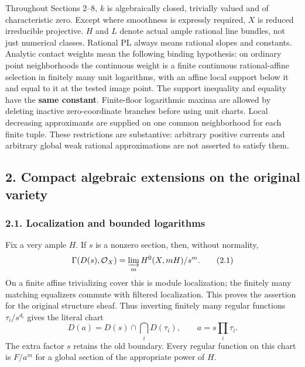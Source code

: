 \documentclass[
  10pt,
]{article}
\begin{document}
Throughout Sections 2--8, \(k\) is algebraically closed, trivially
valued and of characteristic zero. Except where smoothness is expressly
required, \(X\) is reduced irreducible projective. \(H\) and \(L\)
denote actual ample rational line bundles, not just numerical classes.
Rational PL always means rational slopes and constants. Analytic contact
weights mean the following binding hypothesis: on ordinary point
neighborhoods the continuous weight is a finite continuous
rational-affine selection in finitely many unit logarithms, with an
affine local support below it and equal to it at the tested image point.
The support inequality and equality have the \textbf{same constant}.
Finite-floor logarithmic maxima are allowed by deleting inactive
zero-coordinate branches before using unit charts. Local decreasing
approximants are supplied on one common neighborhood for each finite
tuple. These restrictions are substantive: arbitrary positive currents
and arbitrary global weak rational approximations are not asserted to
satisfy them.

\subsection{2. Compact algebraic extensions on the original
variety}\label{compact-algebraic-extensions-on-the-original-variety}

\subsubsection{2.1. Localization and bounded
logarithms}\label{localization-and-bounded-logarithms}

Fix a very ample \(H\). If \(s\) is a nonzero section, then, without
normality,
\[\Gamma(D(s),\mathcal O_X)=\varinjlim_m H^0(X,mH)/s^m. \tag{2.1}\] On a
finite affine trivializing cover this is module localization; the
finitely many matching equalizers commute with filtered localization.
This proves the assertion for the original structure sheaf. Thus
inverting finitely many regular functions \(\tau_i/s^{d_i}\) gives the
literal chart
\[D(a)=D(s)\cap\bigcap_iD(\tau_i),\qquad a=s\prod_i\tau_i. \tag{2.2}\]
The extra factor \(s\) retains the old boundary. Every regular function
on this chart is \(F/a^m\) for a global section of the appropriate power
of \(H\).
\end{document}
